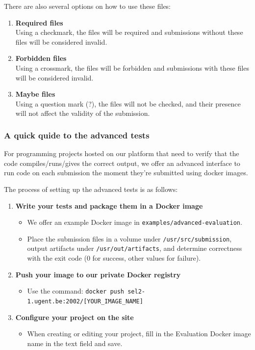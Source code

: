 \documentclass{article}
\begin{document}
There are also several options on how to use these files:

\begin{enumerate}[label=\arabic*.]
    \item \textbf{Required files}\\
    Using a checkmark, the files will be required and submissions without these files will be considered invalid.
    
    \item \textbf{Forbidden files}\\
    Using a crossmark, the files will be forbidden and submissions with these files will be considered invalid.
    
    \item \textbf{Maybe files}\\
    Using a question mark (?), the files will not be checked, and their presence will not affect the validity of the submission.
\end{enumerate}

\subsubsection{A quick quide to the advanced tests}

For programming projects hosted on our platform that need to verify that the code compiles/runs/gives the correct output, we offer an advanced interface to run code on each submission the moment they're submitted using docker images.

The process of setting up the advanced tests is as follows:
\begin{enumerate}[label=\textbf{\arabic*.}]
    \item \textbf{Write your tests and package them in a Docker image}
    \begin{itemize}
        \item We offer an example Docker image in \texttt{examples/advanced-evaluation}.
        \item Place the submission files in a volume under \texttt{/usr/src/submission}, output artifacts under \texttt{/usr/out/artifacts}, and determine correctness with the exit code (0 for success, other values for failure).
    \end{itemize}
    
    \item \textbf{Push your image to our private Docker registry}
    \begin{itemize}
        \item Use the command: \texttt{docker push sel2-1.ugent.be:2002/[YOUR\_IMAGE\_NAME]}
    \end{itemize}
    
    \item \textbf{Configure your project on the site}
    \begin{itemize}
        \item When creating or editing your project, fill in the Evaluation Docker image name in the text field and save.
    \end{itemize}
\end{enumerate}
\end{document}
